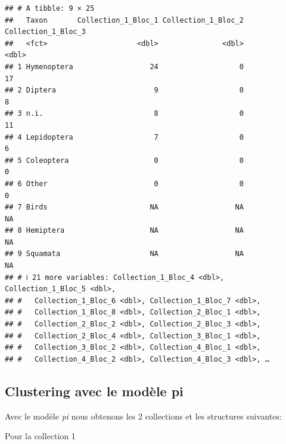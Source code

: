 \begin{verbatim}
## # A tibble: 9 × 25
##   Taxon       Collection_1_Bloc_1 Collection_1_Bloc_2 Collection_1_Bloc_3
##   <fct>                     <dbl>               <dbl>               <dbl>
## 1 Hymenoptera                  24                   0                  17
## 2 Diptera                       9                   0                   8
## 3 n.i.                          8                   0                  11
## 4 Lepidoptera                   7                   0                   6
## 5 Coleoptera                    0                   0                   0
## 6 Other                         0                   0                   0
## 7 Birds                        NA                  NA                  NA
## 8 Hemiptera                    NA                  NA                  NA
## 9 Squamata                     NA                  NA                  NA
## # ℹ 21 more variables: Collection_1_Bloc_4 <dbl>, Collection_1_Bloc_5 <dbl>,
## #   Collection_1_Bloc_6 <dbl>, Collection_1_Bloc_7 <dbl>,
## #   Collection_1_Bloc_8 <dbl>, Collection_2_Bloc_1 <dbl>,
## #   Collection_2_Bloc_2 <dbl>, Collection_2_Bloc_3 <dbl>,
## #   Collection_2_Bloc_4 <dbl>, Collection_3_Bloc_1 <dbl>,
## #   Collection_3_Bloc_2 <dbl>, Collection_4_Bloc_1 <dbl>,
## #   Collection_4_Bloc_2 <dbl>, Collection_4_Bloc_3 <dbl>, …
\end{verbatim}

\hypertarget{clustering-avec-le-moduxe8le-pi}{%
\subsection{Clustering avec le modèle
pi}\label{clustering-avec-le-moduxe8le-pi}}

Avec le modèle \emph{pi} nous obtenons les 2 collections et les
structures suivantes:

Pour la collection 1


